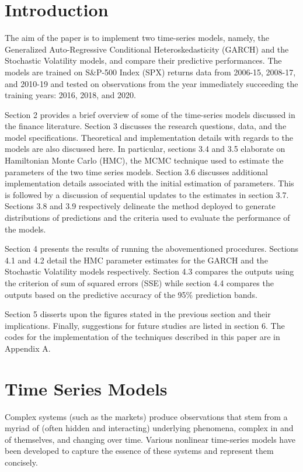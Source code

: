 \documentclass[12pt,letterpaper,reqno,fleqn]{article}
\begin{document}
\section{Introduction}
The aim of the paper is to implement two time-series models, namely, the Generalized Auto-Regressive Conditional Heteroskedasticity (GARCH) and the Stochastic Volatility models, and compare their predictive performances. The models are trained on S\&P-500 Index (SPX) returns data from 2006-15, 2008-17, and 2010-19 and tested on observations from the year immediately succeeding the training years: 2016, 2018, and 2020. 

Section 2 provides a brief overview of some of the time-series models discussed in the finance literature. Section 3 discusses the research questions, data, and the model specifications. Theoretical and implementation details with regards to the models are also discussed here. In particular, sections 3.4 and 3.5 elaborate on Hamiltonian Monte Carlo (HMC), the MCMC technique used to estimate the parameters of the two time series models. Section 3.6 discusses additional implementation details associated with the initial estimation of parameters. This is followed by a discussion of sequential updates to the estimates in section 3.7. Sections 3.8 and 3.9 respectively delineate the method deployed to generate distributions of predictions and the criteria used to evaluate the performance of the models.

Section 4 presents the results of running the abovementioned procedures. Sections 4.1 and 4.2 detail the HMC parameter estimates for the GARCH and the Stochastic Volatility models respectively. Section 4.3 compares the outputs using the criterion of sum of squared errors (SSE) while section 4.4 compares the outputs based on the predictive accuracy of the 95\% prediction bands. 

Section 5 disserts upon the figures stated in the previous section and their implications. Finally, suggestions for future studies are listed in section 6. The codes for the implementation of the techniques described in this paper are in Appendix A.

\newpage

\section{Time Series Models} 
Complex systems (such as the markets) produce observations that stem from a myriad of (often hidden and interacting) underlying phenomena, complex in and of themselves, and changing over time. Various nonlinear time-series models have been developed to capture the essence of these systems and represent them concisely.  
\end{document}
